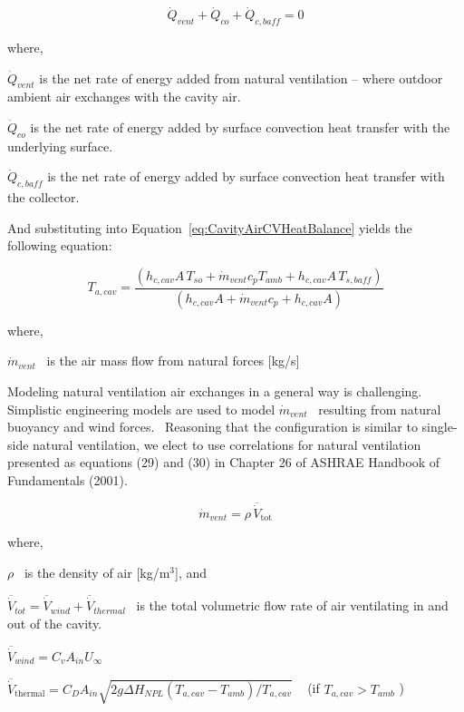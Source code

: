 \begin{equation}
{\dot Q_{vent}} + {\dot Q_{co}} + {\dot Q_{c,baff}} = 0
\label{eq:CavityAirCVHeatBalance}
\end{equation}

where,

\(\dot{Q}_{vent}\) is the net rate of energy added from natural ventilation -- where outdoor ambient air exchanges with the cavity air.

\(\dot{Q}_{co}\) is the net rate of energy added by surface convection heat transfer with the underlying surface.

\({\dot Q_{c,baff}}\) is the net rate of energy added by surface convection heat transfer with the collector.

And substituting into Equation~\ref{eq:CavityAirCVHeatBalance} yields the following equation:

\begin{equation}
{T_{a,cav}} = \frac{{\left( {{h_{c,cav}}A\,{T_{so}} + {{\dot m}_{vent}}{c_p}{T_{amb}} + {h_{c,cav}}A\,{T_{s,baff}}} \right)}}{{\left( {{h_{c,cav}}A + {{\dot m}_{vent}}{c_p} + {h_{c,cav}}A} \right)}}
\end{equation}

where,

\({\dot m_{vent}}\) ~is the air mass flow from natural forces {[}kg/s{]}

Modeling natural ventilation air exchanges in a general way is challenging.~ Simplistic engineering models are used to model \({\dot m_{vent}}\) ~resulting from natural buoyancy and wind forces.~ Reasoning that the configuration is similar to single-side natural ventilation, we elect to use correlations for natural ventilation presented as equations (29) and (30) in Chapter 26 of ASHRAE Handbook of Fundamentals (2001).

\begin{equation}
{\dot m_{vent}} = \rho \,{{\overline{\dot V}}_{{\mathrm{tot}}}}
\end{equation}

where,

\(\rho\) ~is the density of air {[}kg/m\(^{3}\){]}, and

\(\overline{\dot{V}}_{tot} = \overline{\dot{V}}_{wind} + \overline{\dot{V}}_{thermal}\) ~is the total volumetric flow rate of air ventilating in and out of the cavity.

\(\overline{\dot{V}}_{wind} = C_{v}A_{in}U_{\infty}\)

\({{\overline{\dot V}}_{{\mathrm{thermal}}}} = {C_D}{A_{in}}\sqrt {2g\Delta {H_{NPL}}\left( {{T_{a,cav}} - {T_{amb}}} \right)/{T_{a,cav}}}\) ~ (if \(T_{a,cav} > T_{amb}\) )

